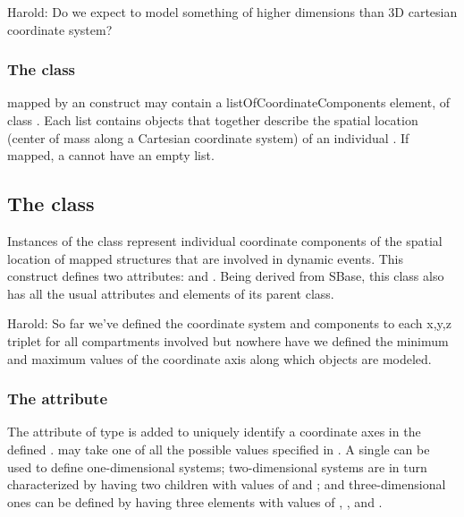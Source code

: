 {\color{red} Harold: \notice  Do we expect to model something of higher dimensions than 3D cartesian coordinate system?}

\subsubsection{The  class}
\label{subsec:listCoordComp}

\Compartments mapped by an \Element construct may contain a listOfCoordinateComponents element, of class \ListOfCoordinateComponents. Each list contains \CoordinateComponent objects that together describe the spatial location (center of mass along a Cartesian coordinate system) of an individual \Compartment. If mapped, a \Compartment cannot have an empty \ListOfCoordinateComponents list.

\subsection{The  class}
\label{subsec:coordComp}

Instances of the \CoordinateComponent class represent individual coordinate components of the spatial location of mapped \Compartment structures that are involved in dynamic events. This construct defines two attributes:  and . Being derived from SBase, this class also has all the usual attributes and elements of its parent class.

{\color{red} Harold: \notice So far we've defined the coordinate system and components to each x,y,z triplet for all compartments involved but nowhere have we defined the minimum and maximum values of the coordinate axis along which objects are modeled.
}

\subsubsection{The  attribute}
\label{attr:coordIndex}

The attribute  of type  is added to uniquely identify a coordinate axes in the defined .  may take one of all the possible  values specified in . A single  \CoordinateComponent can be used to define one-dimensional systems; two-dimensional systems are in turn characterized by having two \CoordinateComponent children with  values of  and ; and three-dimensional ones can be defined by having three \CoordinateComponent elements with  values of , , and . 

